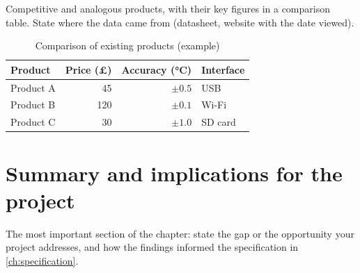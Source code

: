 \begin{guidance}
Competitive and analogous products, with their key figures in a comparison
table. State where the data came from (datasheet, website with the date
viewed).
\end{guidance}

\begin{table}[htbp]
  \centering
  \caption{Comparison of existing products (example)}
  \label{tab:market}
  \begin{tabular}{lrrl}
    \toprule
    Product   & Price (£) & Accuracy (\si{\celsius}) & Interface \\
    \midrule
    Product A & 45  & $\pm 0.5$ & USB       \\
    Product B & 120 & $\pm 0.1$ & Wi-Fi     \\
    Product C & 30  & $\pm 1.0$ & SD card   \\
    \bottomrule
  \end{tabular}
\end{table}

\section{Summary and implications for the project}
\label{sec:lit-summary}

\begin{guidance}
The most important section of the chapter: state the gap or the opportunity
your project addresses, and how the findings informed the specification
in \cref{ch:specification}.
\end{guidance}
